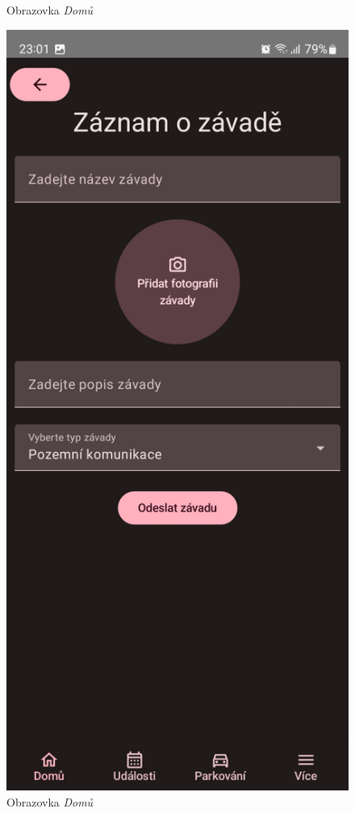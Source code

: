 \begin{figure}[H]
    \caption{Obrazovka \textit{Domů}}
  \endminipage\hfill
    \includegraphics[width=\linewidth]{screens/1c_B.jpg}
    \caption{Obrazovka \textit{Domů}}
  \endminipage\hfill
\end{figure}

